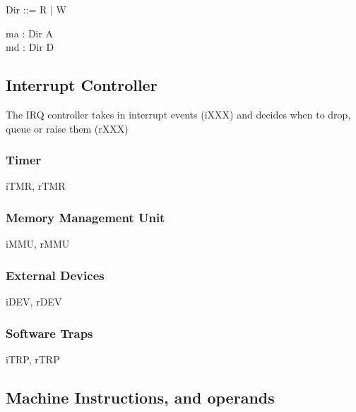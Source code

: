 \begin{circus}
Dir ::= R  %
        | W  %
\end{circus}

\begin{circus}
\circchannel ma : Dir \cross A\\  %
\circchannel md : Dir \cross D  %
\end{circus}


\subsection{Interrupt Controller}

The IRQ controller takes in interrupt events (iXXX)
and decides when to drop, queue or raise them (rXXX)


\subsubsection{Timer}

\begin{circus}
\circchannel iTMR, rTMR
\end{circus}

\subsubsection{Memory Management Unit}

\begin{circus}
\circchannel iMMU, rMMU
\end{circus}

\subsubsection{External Devices}

\begin{circus}
\circchannel iDEV, rDEV
\end{circus}

\subsubsection{Software Traps}
\begin{circus}
\circchannel iTRP, rTRP
\end{circus}

\subsection{Machine Instructions, and operands}

